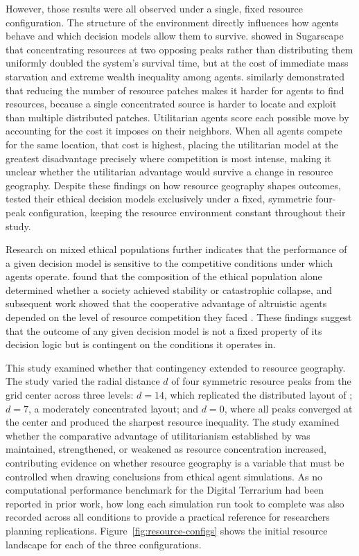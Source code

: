 \documentclass{icsthesis}
\begin{document}
\begin{mainmatter}
However, those results were all observed under a single, fixed resource configuration. The structure of the environment directly influences how agents behave and which decision models allow them to survive. \citet{Hawick2014} showed in Sugarscape that concentrating resources at two opposing peaks rather than distributing them uniformly doubled the system's survival time, but at the cost of immediate mass starvation and extreme wealth inequality among agents. \citet{Fagan2022} similarly demonstrated that reducing the number of resource patches makes it harder for agents to find resources, because a single concentrated source is harder to locate and exploit than multiple distributed patches. Utilitarian agents score each possible move by accounting for the cost it imposes on their neighbors. When all agents compete for the same location, that cost is highest, placing the utilitarian model at the greatest disadvantage precisely where competition is most intense, making it unclear whether the utilitarian advantage would survive a change in resource geography. Despite these findings on how resource geography shapes outcomes, \citet{KremerHerman2024} tested their ethical decision models exclusively under a fixed, symmetric four-peak configuration, keeping the resource environment constant throughout their study.

Research on mixed ethical populations further indicates that the performance of a given decision model is sensitive to the competitive conditions under which agents operate. \citet{KremerHerman2024} found that the composition of the ethical population alone determined whether a society achieved stability or catastrophic collapse, and subsequent work showed that the cooperative advantage of altruistic agents depended on the level of resource competition they faced \citep{Xiang2008,Scalco2015}. These findings suggest that the outcome of any given decision model is not a fixed property of its decision logic but is contingent on the conditions it operates in.

This study examined whether that contingency extended to resource geography. The study varied the radial distance $d$ of four symmetric resource peaks from the grid center across three levels: $d = 14$, which replicated the distributed layout of \citet{KremerHerman2024}; $d = 7$, a moderately concentrated layout; and $d = 0$, where all peaks converged at the center and produced the sharpest resource inequality. The study examined whether the comparative advantage of utilitarianism established by \citet{KremerHerman2024} was maintained, strengthened, or weakened as resource concentration increased, contributing evidence on whether resource geography is a variable that must be controlled when drawing conclusions from ethical agent simulations. As no computational performance benchmark for the Digital Terrarium had been reported in prior work, how long each simulation run took to complete was also recorded across all conditions to provide a practical reference for researchers planning replications. Figure~\ref{fig:resource-configs} shows the initial resource landscape for each of the three configurations.


\end{mainmatter}
\end{document}
